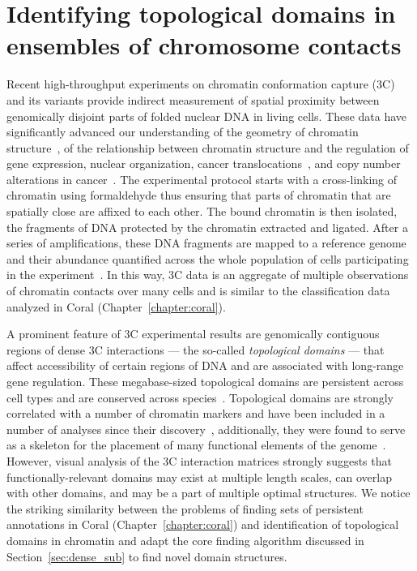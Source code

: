 \documentclass[12pt]{cmuthesis}
\begin{document}
\chapter{Identifying topological domains in ensembles of chromosome contacts}


Recent high-throughput experiments on chromatin conformation capture (3C) and its variants provide indirect measurement of spatial proximity between genomically disjoint parts of folded nuclear DNA in living cells. These data have significantly advanced our understanding of the geometry of chromatin structure~\cite{Gibcus2013}, of the relationship between chromatin structure and the regulation of gene expression, nuclear organization, cancer translocations~\cite{Cavalli2013}, and copy number alterations in cancer~\cite{Fudenberg2011}. The experimental protocol starts with a cross-linking of chromatin using formaldehyde thus ensuring that parts of chromatin that are spatially close are affixed to each other. The bound chromatin is then isolated, the fragments of DNA protected by the chromatin extracted and ligated. After a series of amplifications, these DNA fragments are mapped to a reference genome and their abundance quantified across the whole population of cells participating in the experiment~\cite{Dekker3c}. In this way, 3C data is an aggregate of multiple observations of chromatin contacts over many cells and is similar to the classification data analyzed in Coral (Chapter~\ref{chapter:coral}). 

A prominent feature of 3C experimental results are genomically contiguous regions of dense 3C interactions --- the so-called \textit{topological domains} --- that affect accessibility of certain regions of DNA and are associated with long-range gene regulation. These megabase-sized topological domains are persistent across cell types and are conserved across species~\cite{Dixon2012}. Topological domains are strongly correlated with a number of chromatin markers and have been included in a number of analyses since their discovery~\cite{Hou2012,Kolbl2012,Lin2012}, additionally, they were found to serve as a skeleton for the placement of many functional elements of the genome~\cite{Bickmore2013a,Tanay2013}. However, visual analysis of the 3C interaction matrices strongly suggests that functionally-relevant domains may exist at multiple length scales, can overlap with other domains, and may be a part of multiple optimal structures. We notice the striking similarity between the problems of finding sets of persistent annotations in Coral (Chapter~\ref{chapter:coral}) and identification of topological domains in chromatin and adapt the core finding algorithm discussed in Section~\ref{sec:dense_sub} to find novel domain structures.
\end{document}
